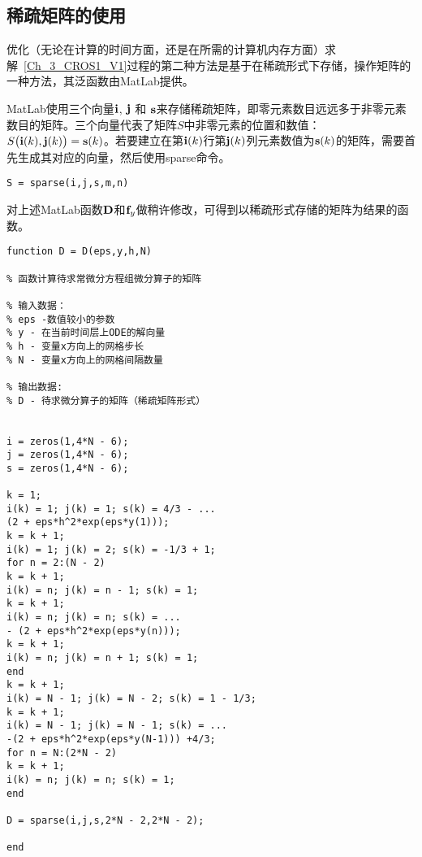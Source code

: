 \documentclass[twoside]{book}
\def\textbf{\bf}%
\begin{document}
\begin{CJK*}{GBK}{song}

\subsection{稀疏矩阵的使用}

优化（无论在计算的时间方面，还是在所需的计算机内存方面）求解~\eqref{Ch_3_CROS1_V1}过程的第二种方法是基于在稀疏形式下存储，操作矩阵的一种方法，其泛函数由MatLab提供。

MatLab使用三个向量$\emph{\textbf{i}}$, $\emph{\textbf{j}}$ 和 $\emph{\textbf{s}}$来存储稀疏矩阵，即零元素数目远远多于非零元素数目的矩阵。三个向量代表了矩阵$S$中非零元素的位置和数值：$S\big(\emph{\textbf{i}}(k),\emph{\textbf{j}}(k)\big) = \emph{\textbf{s}}(k)$。若要建立在第$\emph{\textbf{i}}(k)$行第$\emph{\textbf{j}}(k)$列元素数值为$\emph{\textbf{s}}(k)$的矩阵，需要首先生成其对应的向量，然后使用sparse命令。
\begin{lstlisting}
S = sparse(i,j,s,m,n)
\end{lstlisting}
对上述MatLab函数$\emph{\textbf{D}}$和$\emph{\textbf{f}}_y$做稍许修改，可得到以稀疏形式存储的矩阵为结果的函数。

%
\begin{lstlisting}
function D = D(eps,y,h,N)

% 函数计算待求常微分方程组微分算子的矩阵

% 输入数据：
% eps -数值较小的参数
% y - 在当前时间层上ODE的解向量
% h - 变量x方向上的网格步长
% N - 变量x方向上的网格间隔数量

% 输出数据:
% D - 待求微分算子的矩阵（稀疏矩阵形式）


i = zeros(1,4*N - 6);
j = zeros(1,4*N - 6);
s = zeros(1,4*N - 6);

k = 1;
i(k) = 1; j(k) = 1; s(k) = 4/3 - ...
(2 + eps*h^2*exp(eps*y(1)));
k = k + 1;
i(k) = 1; j(k) = 2; s(k) = -1/3 + 1;
for n = 2:(N - 2)
k = k + 1;
i(k) = n; j(k) = n - 1; s(k) = 1;
k = k + 1;
i(k) = n; j(k) = n; s(k) = ...
- (2 + eps*h^2*exp(eps*y(n)));
k = k + 1;
i(k) = n; j(k) = n + 1; s(k) = 1;
end
k = k + 1;
i(k) = N - 1; j(k) = N - 2; s(k) = 1 - 1/3;
k = k + 1;
i(k) = N - 1; j(k) = N - 1; s(k) = ...
-(2 + eps*h^2*exp(eps*y(N-1))) +4/3;
for n = N:(2*N - 2)
k = k + 1;
i(k) = n; j(k) = n; s(k) = 1;
end

D = sparse(i,j,s,2*N - 2,2*N - 2);

end
\end{lstlisting}


\end{CJK*}
\end{document}
